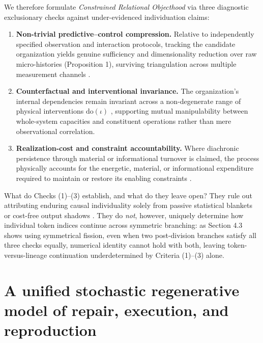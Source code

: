 \documentclass[11pt,a4paper]{article}
\providecommand{\tightlist}{\setlength{\itemsep}{2pt}\setlength{\parskip}{0pt}}
\begin{document}
We therefore formulate \emph{Constrained Relational Objecthood} via
three diagnostic exclusionary checks against under-evidenced
individuation claims:

\begin{enumerate}
\def\labelenumi{\arabic{enumi}.}
\tightlist
\item
  \textbf{Non-trivial predictive--control compression.} Relative to
  independently specified observation and interaction protocols,
  tracking the candidate organization yields genuine sufficiency and
  dimensionality reduction over raw micro-histories (Proposition 1),
  surviving triangulation across multiple measurement channels
  \citep{wimsatt2007, ladymanRoss2007}.
\item
  \textbf{Counterfactual and interventional invariance.} The
  organization's internal dependencies remain invariant across a
  non-degenerate range of physical interventions \(\mathrm{do}(\iota)\)
  \citep{hacking1983, woodward2003}, supporting mutual manipulability
  between whole-system capacities and constituent operations
  \citep{craver2007} rather than mere observational correlation.
\item
  \textbf{Realization-cost and constraint accountability.} Where
  diachronic persistence through material or informational turnover is
  claimed, the process physically accounts for the energetic, material,
  or informational expenditure required to maintain or restore its
  enabling constraints \citep{jonas1966, rosen1991, montevilMossio2015}.
\end{enumerate}

What do Checks (1)--(3) establish, and what do they leave open? They
rule out attributing enduring causal individuality solely from passive
statistical blankets or cost-free output shadows
\citep{cartwright1999, dupre1993}. They do \emph{not}, however, uniquely
determine how individual token indices continue across symmetric
branching: as Section 4.3 shows using symmetrical fission, even when two
post-division branches satisfy all three checks equally, numerical
identity cannot hold with both, leaving token-versus-lineage
continuation underdetermined by Criteria (1)--(3) alone.

\section{A unified stochastic regenerative model of repair, execution,
and
reproduction}\label{a-unified-stochastic-regenerative-model-of-repair-execution-and-reproduction}
\end{document}
